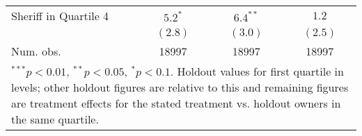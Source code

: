 \begin{table}[htb]
\begin{center}
\begin{tabular}{l c c c }
Sheriff in Quartile 4 & $5.2^{*}$     & $6.4^{**}$    & $1.2$        \\
                      & $(2.8)$       & $(3.0)$       & $(2.5)$      \\
\hline
Num. obs.             & 18997         & 18997         & 18997        \\
\hline
\multicolumn{4}{l}{\scriptsize{\parbox{.75\linewidth}{$^{***}p<0.01$, $^{**}p<0.05$, $^*p<0.1$. Holdout values for first quartile in levels; other holdout figures are relative to this and remaining figures are treatment effects for the stated treatment vs. holdout owners in the same quartile.}}}
\end{tabular}
\label{tbl:lpm_hetero}
\end{center}
\end{table}

